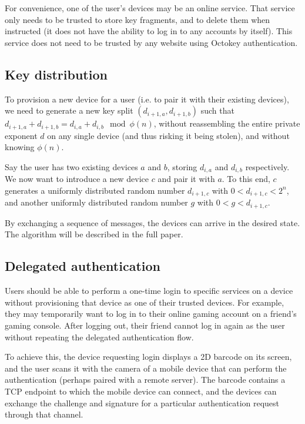 \documentclass{acm_proc_article-sp}
\begin{document}
For convenience, one of the user's devices may be an online service. That service only needs to be
trusted to store key fragments, and to delete them when instructed (it does not have the ability to
log in to any accounts by itself). This service does not need to be trusted by any website using
Octokey authentication.

\subsection{Key distribution}

To provision a new device for a user (i.e. to pair it with their existing devices), we need to
generate a new key split $(d_{i+1,a}, d_{i+1,b})$ such that
$d_{i+1,a} + d_{i+1,b} = d_{i,a} + d_{i,b} \mod \phi(n)$, without reassembling the entire private
exponent $d$ on any single device (and thus risking it being stolen), and without knowing $\phi(n)$.

Say the user has two existing devices $a$ and $b$, storing $d_{i,a}$ and $d_{i,b}$ respectively. We
now want to introduce a new device $c$ and pair it with $a$. To this end, $c$ generates a uniformly
distributed random number $d_{i+1,c}$ with $0 < d_{i+1,c} < 2^n$, and another uniformly distributed
random number $g$ with $0 < g < d_{i+1,c}$.

By exchanging a sequence of messages, the devices can arrive in the desired state. The algorithm
will be described in the full paper.

\subsection{Delegated authentication}

Users should be able to perform a one-time login to specific services on a device without
provisioning that device as one of their trusted devices. For example, they may temporarily want to
log in to their online gaming account on a friend's gaming console. After logging out, their friend
cannot log in again as the user without repeating the delegated authentication flow.

To achieve this, the device requesting login displays a 2D barcode on its screen, and the user scans
it with the camera of a mobile device that can perform the authentication (perhaps paired with a
remote server). The barcode contains a TCP endpoint to which the mobile device can connect, and
the devices can exchange the challenge and signature for a particular authentication request through
that channel.
\end{document}
